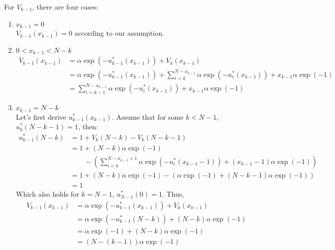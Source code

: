 \documentclass[11pt, a4paper, oneside]{memoir}
\begin{document}
For $V_{k-1}$, there are four cases:
\begin{enumerate}
  \item $x_{k-1} = 0$ \\
        $V_{k-1}(x_{k-1}) = 0$ according to our assumption.
  \item $0 < x_{k-1} < N-k$
        \begin{align*}
          V_{k-1}(x_{k-1}) & = \alpha \exp(-u_{k-1}^*(x_{k-1})) + V_k(x_{k-1})                                                                  \\
                           & = \alpha \exp(-u_{k-1}^*(x_{k-1})) + \sum_{i=k}^{N-x_{k-1}} \alpha \exp(-u_i^*(x_{k-1})) + x_{k-1} \alpha \exp(-1) \\
                           & = \sum_{i=k-1}^{N-x_{k-1}} \alpha \exp(-u_i^*(x_{k-1})) + x_{k-1} \alpha \exp(-1)
        \end{align*}
  \item $x_{k-1} = N-k$ \\
        Let's first derive $u_{k-1}^*(x_{k-1})$. Assume that for some $k < N-1$, $u_k^*(N-k-1) = 1$, then:
        \begin{align*}
          u_{k-1}^*(N-k) & = 1 + V_k(N-k) - V_k(N-k-1)                                                                                   \\
                         & = 1 + (N-k)\alpha \exp(-1)                                                                                    \\
                         & \qquad - \left( \sum_{i=k}^{N-x_{k-1}+1} \alpha \exp(-u_i^*(x_{k-1}-1)) + (x_{k-1}-1) \alpha \exp(-1) \right) \\
                         & = 1 + (N-k)\alpha \exp(-1) - \left( \alpha \exp(-1) + (N-k-1) \alpha \exp(-1) \right)                         \\
                         & = 1
        \end{align*}
        Which also holds for $k=N-1$, $u_{N-1}^*(0) = 1$. Thus,
        \begin{align*}
          V_{k-1}(x_{k-1}) & = \alpha \exp(-u_{k-1}^*(x_{k-1})) + V_k(x_{k-1})     \\
                           & = \alpha \exp(-u_{k-1}^*(N-k)) + (N-k)\alpha \exp(-1) \\
                           & = \alpha \exp(-1) + (N-k) \alpha \exp(-1)             \\
                           & = (N-(k-1)) \alpha \exp(-1)
        \end{align*}

\end{enumerate}
\end{document}

